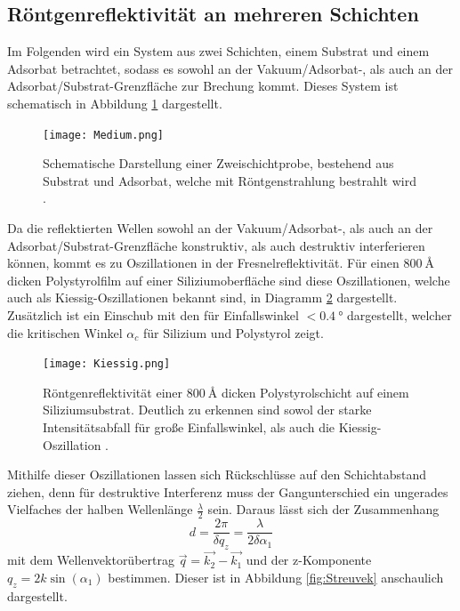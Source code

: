 \subsection{Röntgenreflektivität an mehreren Schichten}
Im Folgenden wird ein System aus zwei Schichten, einem Substrat und einem Adsorbat betrachtet, sodass es sowohl an der
Vakuum/Adsorbat-, als auch an der Adsorbat/Substrat-Grenzfläche zur Brechung kommt. Dieses System ist schematisch in
Abbildung \ref{fig:mehr} dargestellt.

\begin{figure}
  \centering
  \texttt{[image: Medium.png]}
  \caption{Schematische Darstellung einer Zweischichtprobe, bestehend aus Substrat und Adsorbat, welche mit
  Röntgenstrahlung bestrahlt wird \cite{XSR}.}
  \label{fig:mehr}
\end{figure}

Da die reflektierten Wellen sowohl an der Vakuum/Adsorbat-, als auch an der Adsorbat/Substrat-Grenzfläche konstruktiv,
als auch destruktiv interferieren können, kommt es zu Oszillationen in der Fresnelreflektivität.
Für einen $\SI{800}{\angstrom}$ dicken Polystyrolfilm auf einer Siliziumoberfläche sind diese Oszillationen, welche
auch als Kiessig-Oszillationen bekannt sind, in Diagramm \ref{fig:Kiessig} dargestellt. Zusätzlich ist ein Einschub mit den
für Einfallswinkel $<\SI{0,4}{\degree}$ dargestellt, welcher die kritischen Winkel $\alpha_c$ für Silizium und
Polystyrol zeigt.

\begin{figure}
  \centering
  \texttt{[image: Kiessig.png]}
  \caption{Röntgenreflektivität einer $\SI{800}{\angstrom}$ dicken Polystyrolschicht auf einem Siliziumsubstrat.
  Deutlich zu erkennen sind sowol der starke Intensitätsabfall für große Einfallswinkel, als auch die Kiessig-Oszillation \cite{skript}.}
  \label{fig:Kiessig}
\end{figure}

Mithilfe dieser Oszillationen lassen sich Rückschlüsse auf den Schichtabstand ziehen, denn für destruktive Interferenz
muss der Gangunterschied ein ungerades Vielfaches der halben Wellenlänge $\frac{\lambda}{2}$ sein.
Daraus lässt sich der Zusammenhang
\begin{equation}
  d=\frac{2\pi}{\delta q_z}=\frac{\lambda}{2\delta\alpha_1}
  \label{eqn:dicke}
\end{equation}
mit dem Wellenvektorübertrag $\vec{q}=\vec{k_2}-\vec{k_1}$ und der z-Komponente $q_z=2k\sin(\alpha_1)$ bestimmen. Dieser ist in Abbildung \ref{fig:Streuvek} anschaulich
dargestellt.

